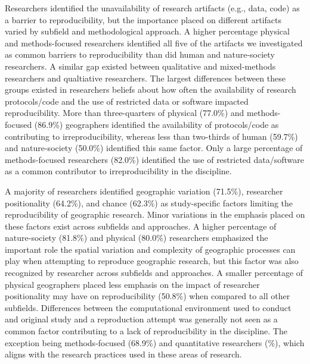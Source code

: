 \documentclass[]{interact}
\theoremstyle{plain}%
\theoremstyle{definition}
\theoremstyle{remark}
\begin{document}
Researchers identified the unavailability of research artifacts (e.g., data, code) as a barrier to reproducibility, but the importance placed on different artifacts varied by subfield and methodological approach.
A higher percentage physical and methods-focused researchers identified all five of the artifacts we investigated as common barriers to reproducibility than did human and nature-society researchers.
A similar gap existed between qualitative and mixed-methods researchers and qualtiative researchers. 
The largest differences between these groups existed in researchers beliefs about how often the availability of research protocols/code and the use of restricted data or software impacted reproducibility.
More than three-quarters of physical (77.0\%) and methods-focused (86.9\%) geographers identified the availability of protocols/code as contributing to irreproducibility, whereas less than two-thirds of human (59.7\%) and nature-society (50.0\%) identified this same factor. 
Only a large percentage of methods-focused researchers (82.0\%) identified the use of restricted data/software as a common contributor to irreproducibility in the discipline.  

A majority of researchers identified geographic variation (71.5\%), researcher positionality (64.2\%), and chance (62.3\%) as study-specific factors limiting the reproducibility of geographic research.
Minor variations in the emphasis placed on these factors exist across subfields and approaches. 
A higher percentage of nature-society (81.8\%) and physical (80.0\%) researchers emphasized the important role the spatial variation and complexity of geographic processes can play when attempting to reproduce geographic research, but this factor was also recognized by researcher across subfields and approaches. 
A smaller percentage of physical geographers placed less emphasis on the impact of researcher positionality may have on reproducibility (50.8\%) when compared to all other subfields.  
Differences between the computational environment used to conduct and original study and a reproduction attempt was generally not seen as a common factor contributing to a lack of reproducibility in the discipline. 
The exception being methods-focused (68.9\%) and quantitative researchers (\%), which aligns with the research practices used in these areas of research.


\end{document}
